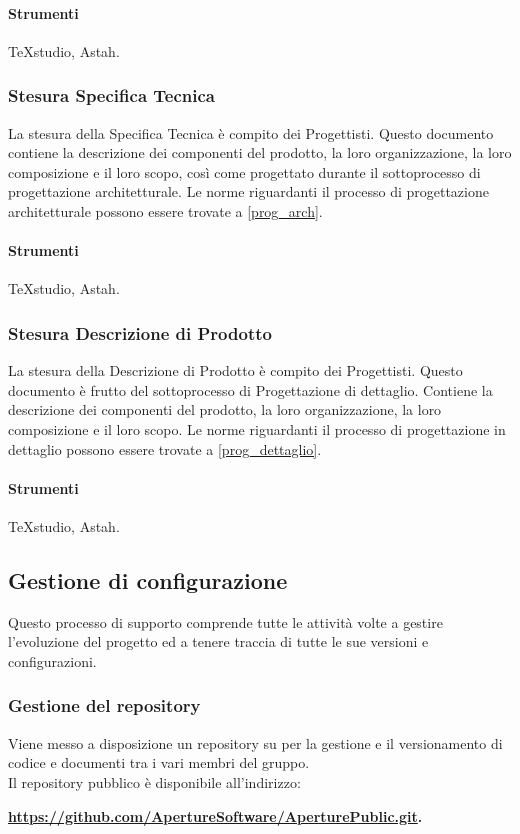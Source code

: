 \paragraph{Strumenti}
TeXstudio, Astah.

\subsubsection{Stesura Specifica Tecnica}
La stesura della Specifica Tecnica è compito dei Progettisti.
Questo documento contiene la descrizione dei componenti del prodotto, la loro organizzazione, la loro composizione e il loro scopo, così come progettato durante il sottoprocesso di progettazione architetturale.
Le norme riguardanti il processo di progettazione architetturale possono essere trovate a \ref{prog_arch}.

\paragraph{Strumenti}
TeXstudio, Astah.

\subsubsection{Stesura Descrizione di Prodotto}
La stesura della Descrizione di Prodotto è compito dei Progettisti.
Questo documento è frutto del sottoprocesso di Progettazione di dettaglio. Contiene la descrizione dei componenti del prodotto, la loro organizzazione, la loro composizione e il loro scopo.
Le norme riguardanti il processo di progettazione in dettaglio possono essere trovate a \ref{prog_dettaglio}.

\paragraph{Strumenti}
TeXstudio, Astah.

\subsection{Gestione di configurazione}
Questo processo di supporto comprende tutte le attività volte a gestire l'evoluzione del progetto ed a tenere traccia di tutte le sue versioni e configurazioni.

\subsubsection{Gestione del repository}
Viene messo a disposizione un repository  su  per la gestione e il versionamento di codice e documenti tra i vari membri del gruppo.\\
Il repository pubblico è disponibile all'indirizzo: \\
\begin{center}
\textbf{\url{https://github.com/ApertureSoftware/AperturePublic.git}.}
\end{center}

